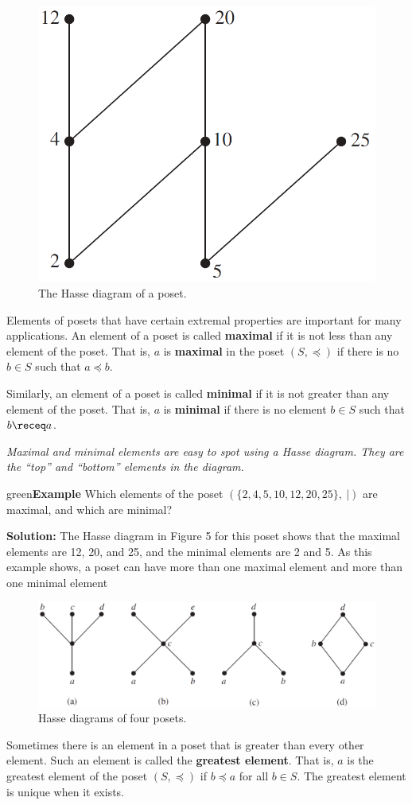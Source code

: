 \documentclass[11pt]{article}
\newenvironment{example}[1][\unskip]{\begin{mybox}{green}{\textbf{Example} {#1}}}{\end{mybox}}
\begin{document}
\begin{figure}
    \centering
    \includegraphics[width=.3\textwidth]{img/ch9.6-f5.png}
    \caption{The Hasse diagram of a poset.}
    \label{fig:my_label}
\end{figure}

Elements of posets that have certain extremal properties are important for many applications. An element of a poset is called \textbf{maximal} if it is not less than any element of the poset. That is, $a$ is \textbf{maximal} in the poset $(S, \preceq)$ if there is no $b \in S$ such that $a \preceq b$. 

Similarly, an element of a poset is called \textbf{minimal} if it is not greater than any element of the poset. That is, $a$ is \textbf{minimal} if there is no element $b \in S$ such that $b \receq a$. 

\textit{Maximal and minimal elements are easy to spot using a Hasse diagram. They are the “top” and “bottom” elements in the diagram.}

\begin{example}
Which elements of the poset $(\{2, 4, 5, 10, 12, 20, 25\},\ |)$ are maximal, and which are minimal?

\textbf{Solution:}
The Hasse diagram in Figure 5 for this poset shows that the maximal elements are 12, 20, and 25, and the minimal elements are 2 and 5. As this example shows, a poset can have more than one maximal element and more than one minimal element
\end{example}

\begin{figure}
    \centering
    \includegraphics[width=.52\textwidth]{img/ch9.6-f6.png}
    \caption{Hasse diagrams of four posets.}
    \label{fig:my_label}
\end{figure}

Sometimes there is an element in a poset that is greater than every other element. Such an element is called the \textbf{greatest element}. That is, $a$ is the greatest element of the poset $(S, \preceq)$ if $b \preceq a$ for all $b \in S$. The greatest element is unique when it exists.
\end{document}
